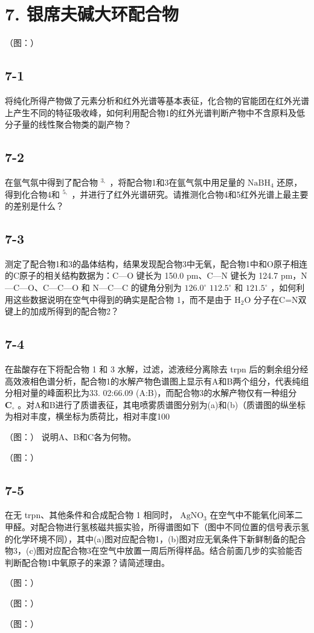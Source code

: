 \section*{7. 银席夫碱大环配合物}
（图：）

\subsection*{7-1}
将纯化所得产物做了元素分析和红外光谱等基本表征，化合物的官能团在红外光谱上产⽣不同的特征吸收峰，如何利⽤配合物1的红外光谱判断产物中不含原料及低分⼦量的线性聚合物类的副产物？

\subsection*{7-2}
在氩⽓氛中得到了配合物 $^ { 3 , }$ ，将配合物1和3在氩⽓氛中⽤⾜量的 $\mathrm { N a B H _ { 4 } }$ 还原，得到化合物4和 $^ { 5 , }$ ，并进⾏了红外光谱研究。请推测化合物4和5红外光谱上最主要的差别是什么？

\subsection*{7-3}
测定了配合物1和3的晶体结构，结果发现配合物3中⽆氧，配合物1中和O原⼦相连的C原⼦的相关结构数据为：C—O 键⻓为 150.0 pm、C—N 键⻓为 124.7 pm，N—C—O、C—C—O 和 N—C—C 的键⻆分别为 $1 2 6 . 0 ^ { \circ }$ $1 1 2 . 5 ^ { \circ }$ 和 $1 2 1 . 5 ^ { \circ }$ ，如何利⽤这些数据说明在空⽓中得到的确实是配合物 1，⽽不是由于 $\mathrm { H _ { 2 } O }$ 分⼦在C=N双键上的加成所得到的配合物2？

\subsection*{7-4}
在盐酸存在下将配合物 1 和 3 ⽔解，过滤，滤液经分离除去 trpn 后的剩余组分经⾼效液相⾊谱分析，配合物1的⽔解产物⾊谱图上显⽰有A和B两个组分，代表纯组分相对量的峰⾯积⽐为33. 02:66.09 (A:B)，⽽配合物3的⽔解产物仅有⼀种组分 $\mathbf { C } _ { \circ }$ 。对A和B进⾏了质谱表征，其电喷雾质谱图分别为(a)和(b)（质谱图的纵坐标为相对丰度，横坐标为质荷⽐，相对丰度100%

（图：）
说明A、B和C各为何物。

（图：）

\subsection*{7-5}
在⽆ trpn、其他条件和合成配合物 1 相同时， $\mathrm { A g N O _ { 3 } }$ 在空⽓中不能氧化间苯⼆甲醛。对配合物进⾏氢核磁共振实验，所得谱图如下（图中不同位置的信号表⽰氢的化学环境不同），其中(a)图对应配合物1，(b)图对应⽆氧条件下新鲜制备的配合物3，(c)图对应配合物3在空⽓中放置⼀周后所得样品。结合前⾯⼏步的实验能否判断配合物1中氧原⼦的来源？请简述理由。

（图：）

（图：）

（图：）
